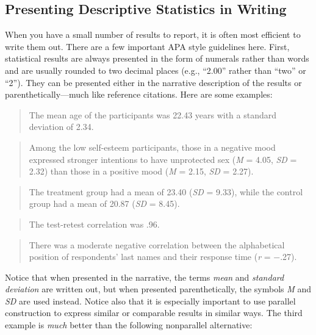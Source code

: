 \documentclass[
]{krantz}
\begin{document}
\subsection*{Presenting Descriptive Statistics in Writing}\label{presenting-descriptive-statistics-in-writing}


When you have a small number of results to report, it is often most efficient to write them out. There are a few important APA style guidelines here. First, statistical results are always presented in the form of numerals rather than words and are usually rounded to two decimal places (e.g., ``2.00'' rather than ``two'' or ``2''). They can be presented either in the narrative description of the results or parenthetically---much like reference citations. Here are some examples:

\begin{quote}
The mean age of the participants was 22.43 years with a standard deviation of 2.34.
\end{quote}

\begin{quote}
Among the low self-esteem participants, those in a negative mood expressed stronger intentions to have unprotected sex (\emph{M} = 4.05, \emph{SD} = 2.32) than those in a positive mood (\emph{M} = 2.15, \emph{SD} = 2.27).
\end{quote}

\begin{quote}
The treatment group had a mean of 23.40 (\emph{SD} = 9.33), while the control group had a mean of 20.87 (\emph{SD} = 8.45).
\end{quote}

\begin{quote}
The test-retest correlation was .96.
\end{quote}

\begin{quote}
There was a moderate negative correlation between the alphabetical position of respondents' last names and their response time (\emph{r} = −.27).
\end{quote}

Notice that when presented in the narrative, the terms \emph{mean} and \emph{standard deviation} are written out, but when presented parenthetically, the symbols \emph{M} and \emph{SD} are used instead. Notice also that it is especially important to use parallel construction to express similar or comparable results in similar ways. The third example is \emph{much} better than the following nonparallel alternative:
\end{document}
